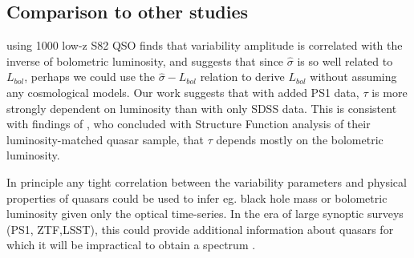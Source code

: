\documentclass[twocolumn]{aastex62}
\begin{document}
\begin{figure*}
\caption{Distribution of posterior draws from MCMC  Eq.~\ref{eq:powlawmodel}, for $f=\tau$ with SDSS only (dashed green line), or SDSS-PS1 (dot-dashed yellow line) combined quasar light curves, against M10 SDSS r-band.  The results from SDSS-only portion are consistent with M10 for the single band. Inclusion of the PS1 portion decreases the timescale dependence on black hole mass, but increases the luminosity dependence. This can be understood as a rotation of the plane in ($\tau$, $M_{i}$, $M_{BH}$) coordinates.  }
\label{fig:MacLeodCeleriteShen2011tau}
\end{figure*} 



\begin{figure*}
\caption{Same as Fig.~\ref{fig:MacLeodCeleriteShen2011tau},  but fitting quasar absolute magnitude, and black hole mass  in Eq.~\ref{eq:powlawmodel} as a function of the asymptotic amplitude $f = SF_{\infty}$. New data from PS1 supports a weaker dependence of variability amplitude with luminosity and black hole mass. }
\label{fig:MacLeodCeleriteShen2011sf}
\end{figure*} 


\subsection{Comparison to other studies}


\cite{sun2018} using 1000 low-z S82 QSO finds that variability amplitude is correlated with the inverse of bolometric luminosity, and suggests that since $\hat{\sigma}$ is so well related to $L
_{bol}$, perhaps we could use the $\hat{\sigma} - L_{bol}$ relation to derive $L_{bol}$ without assuming any cosmological models. Our work suggests that with added PS1 data, $\tau$ is more strongly dependent on luminosity than with only SDSS data.  This is consistent with findings of \cite{sun2018}, who concluded with Structure Function analysis of their luminosity-matched quasar sample, that $\tau$ depends mostly on the bolometric luminosity. 



In principle any tight correlation between the variability parameters and physical properties of quasars could be used to infer eg.  black hole mass or bolometric luminosity  given only the optical time-series. In the era of large synoptic surveys (PS1, ZTF,LSST), this could provide additional information about quasars for which it will be impractical to obtain a spectrum \citep{sanchez2018}.
\end{document}
